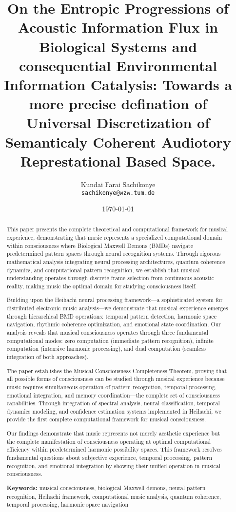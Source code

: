 \documentclass[12pt,a4paper]{article}
\title{On the Entropic Progressions of Acoustic Information Flux in Biological Systems and consequential  Environmental Information Catalysis: Towards a more precise defination  of Universal Discretization of Semanticaly Coherent Audiotory Represtational Based Space.}
\author{Kundai Farai Sachikonye\\

\texttt{sachikonye@wzw.tum.de}}
\date{\today}
\begin{document}
\maketitle

\begin{abstract}
This paper presents the complete theoretical and computational framework for musical experience, demonstrating that music represents a specialized computational domain within consciousness where Biological Maxwell Demons (BMDs) navigate predetermined pattern spaces through neural recognition systems. Through rigorous mathematical analysis integrating neural processing architectures, quantum coherence dynamics, and computational pattern recognition, we establish that musical understanding operates through discrete frame selection from continuous acoustic reality, making music the optimal domain for studying consciousness itself.

Building upon the Heihachi neural processing framework—a sophisticated system for distributed electronic music analysis—we demonstrate that musical experience emerges through hierarchical BMD operations: temporal pattern detection, harmonic space navigation, rhythmic coherence optimization, and emotional state coordination. Our analysis reveals that musical consciousness operates through three fundamental computational modes: zero computation (immediate pattern recognition), infinite computation (intensive harmonic processing), and dual computation (seamless integration of both approaches).

The paper establishes the Musical Consciousness Completeness Theorem, proving that all possible forms of consciousness can be studied through musical experience because music requires simultaneous operation of pattern recognition, temporal processing, emotional integration, and memory coordination—the complete set of consciousness capabilities. Through integration of spectral analysis, neural classification, temporal dynamics modeling, and confidence estimation systems implemented in Heihachi, we provide the first complete computational framework for musical consciousness.

Our findings demonstrate that music represents not merely aesthetic experience but the complete manifestation of consciousness operating at optimal computational efficiency within predetermined harmonic possibility spaces. This framework resolves fundamental questions about subjective experience, temporal processing, pattern recognition, and emotional integration by showing their unified operation in musical consciousness.

\textbf{Keywords:} musical consciousness, biological Maxwell demons, neural pattern recognition, Heihachi framework, computational music analysis, quantum coherence, temporal processing, harmonic space navigation
\end{abstract}
\end{document}
